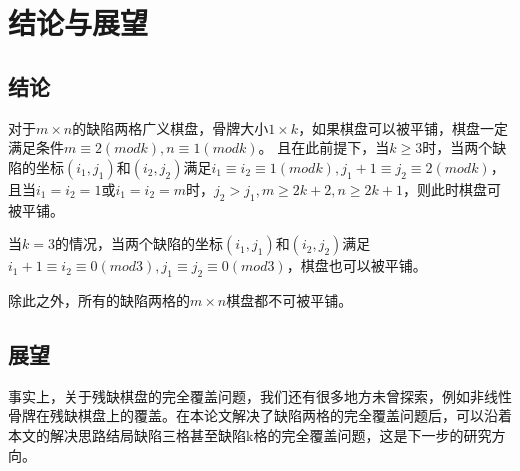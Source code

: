 \chapter{结论与展望}
\section{结论}
对于$m \times n$的缺陷两格广义棋盘，骨牌大小$1 \times k$，如果棋盘可以被平铺，棋盘一定满足条件$m \equiv 2 (mod k), n \equiv 1 (mod k)$。
且在此前提下，当$k \ge 3$时，当两个缺陷的坐标$(i_1, j_1)$和$(i_2, j_2)$满足$i_1 \equiv i_2 \equiv 1 (mod k), j_1 + 1 \equiv j_2 \equiv 2 (mod k)$，
且当$i_1 = i_2 = 1$或$i_1 = i_2 = m$时，$j_2 > j_1, m \ge 2k + 2, n \ge 2k + 1$，则此时棋盘可被平铺。

当$k = 3$的情况，当两个缺陷的坐标$(i_1, j_1)$和$(i_2, j_2)$满足$i_1 + 1\equiv i_2 \equiv 0 (mod 3), j_1 \equiv j_2 \equiv 0 (mod 3)$，棋盘也可以被平铺。

除此之外，所有的缺陷两格的$m \times n$棋盘都不可被平铺。

\section{展望}
事实上，关于残缺棋盘的完全覆盖问题，我们还有很多地方未曾探索，例如非线性骨牌在残缺棋盘上的覆盖。在本论文解决了缺陷两格的完全覆盖问题后，可以沿着本文的解决思路结局缺陷三格甚至缺陷k格的完全覆盖问题，这是下一步的研究方向。
